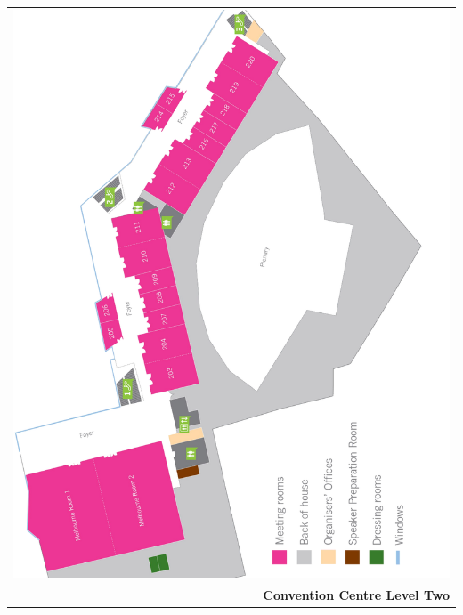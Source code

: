 \begin{center}
  \begin{tabular}{r}
    \includegraphics[width=\textwidth]{content/maps/mcec_floor2.pdf} \\
    \textbf{Convention Centre Level Two}
  \end{tabular}
\end{center}
